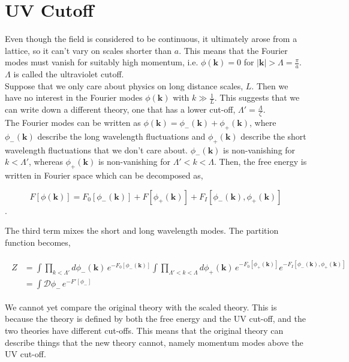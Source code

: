 \section{UV Cutoff}
Even though the field is considered to be continuous, it ultimately arose from a lattice, so it can't vary on scales shorter than $a$. This means that the Fourier modes must vanish for suitably high momentum, i.e. $\phi(\boldsymbol{k})=0$ for $|\boldsymbol{k}|>\Lambda=\frac{\pi}{a}$. $\Lambda$ is called the ultraviolet cutoff.\\

\noindent Suppose that we only care about physics on long distance scales, $L$. Then we have no interest in the Fourier modes $\phi(\boldsymbol{k})$ with $k\gg\frac{1}{L}$. This suggests that we can write down a different theory, one that has a lower cut-off, $\Lambda'=\frac{\Lambda}{\zeta}$.\\

\noindent The Fourier modes can be written as $\phi(\boldsymbol{k})=\phi_-(\boldsymbol{k})+\phi_+(\boldsymbol{k})$, where $\phi_-(\boldsymbol{k})$ describe the long wavelength fluctuations and $\phi_+(\boldsymbol{k})$ describe the short wavelength fluctuations that we don't care about. $\phi_-(\boldsymbol{k})$ is non-vanishing for $k<\Lambda'$, whereas $\phi_+(\boldsymbol{k})$ is non-vanishing for $\Lambda'<k<\Lambda$. Then, the free energy is written in Fourier space which can be decomposed as,

$$F[\phi(\boldsymbol{k})]=F_0[\phi_-(\boldsymbol{k})]+F[\phi_+(\boldsymbol{k})]+F_I[\phi_-(\boldsymbol{k}),\phi_+(\boldsymbol{k})]$$. 

\noindent The third term mixes the short and long wavelength modes. The partition function becomes,

\begin{align*}
    \begin{split}
        Z&=\int\prod_{k<\Lambda'}d\phi_-(\boldsymbol{k})\,e^{-F_0[\phi_-(\boldsymbol{k})]}\int\prod_{\Lambda'<k<\Lambda}d\phi_+(\boldsymbol{k})\,e^{-F_0[\phi_+(\boldsymbol{k})]}e^{-F_I[\phi_-(\boldsymbol{k}),\phi_+(\boldsymbol{k})]}\\
        &=\int\mathcal{D}\phi_-\,e^{-F'[\phi_-]}
    \end{split}
\end{align*}

\noindent We cannot yet compare the original theory with the scaled theory. This is because the theory is defined by both the free energy and the UV cut-off, and the two theories have different cut-offs. This means that the original theory can describe things that the new theory cannot, namely momentum modes above the UV cut-off.\\

